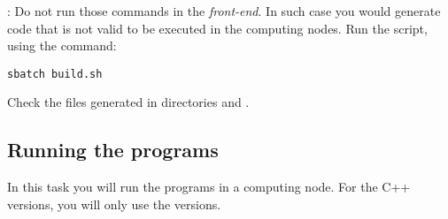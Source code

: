 : 
Do not run those commands in the \emph{front-end}.
In such case you would generate code that is not valid to be executed
in the computing nodes.
Run the script, using the command:

\begin{lstlisting}[style=terminal]
sbatch build.sh
\end{lstlisting}

Check the files generated in directories 
and .

\subsection{Running the programs}

In this task you will run the programs in a computing node.
For the C++ versions, you will only use the  versions.

